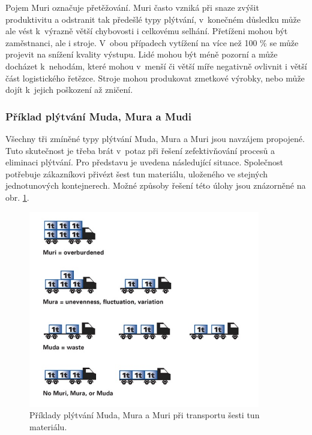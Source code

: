 Pojem Muri označuje přetěžování. Muri často vzniká při snaze zvýšit produktivitu a odstranit tak předešlé typy plýtvání, v~konečném důsledku může ale vést k~výrazně větší chybovosti i celkovému selhání. Přetíženi mohou být zaměstnanci, ale i stroje. V~obou případech vytížení na více než 100 \% se může projevit na snížení kvality výstupu.  Lidé mohou být méně pozorní a může docházet k~nehodám, které mohou v~menší či větší míře negativně ovlivnit i větší část logistického řetězce. Stroje mohou produkovat zmetkové výrobky, nebo může dojít k~jejich poškození až zničení.\cite{bib:Jirsak,bib:LW3}

\subsubsection*{Příklad plýtvání Muda, Mura a Mudi}

Všechny tři zmíněné typy plýtvání Muda, Mura a Muri jsou navzájem propojené. Tuto skutečnost je třeba brát v~potaz při řešení zefektivňování procesů a eliminaci plýtvání. Pro představu je uvedena následující situace. Společnost potřebuje zákazníkovi přivézt šest tun materiálu, uloženého ve stejných jednotunových kontejnerech. Možné způsoby řešení této úlohy jsou znázorněné na obr. \ref{obr:log:3M}.\cite{bib:LW3}

\begin{figure}[h!]
    \centering
    \includegraphics[width=0.9\textwidth]{obrazky/3M.jpg}
    \caption{Příklady plýtvání Muda, Mura a Muri při transportu šesti tun materiálu.\cite{bib:LW3}}
    \label{obr:log:3M}
\end{figure}


